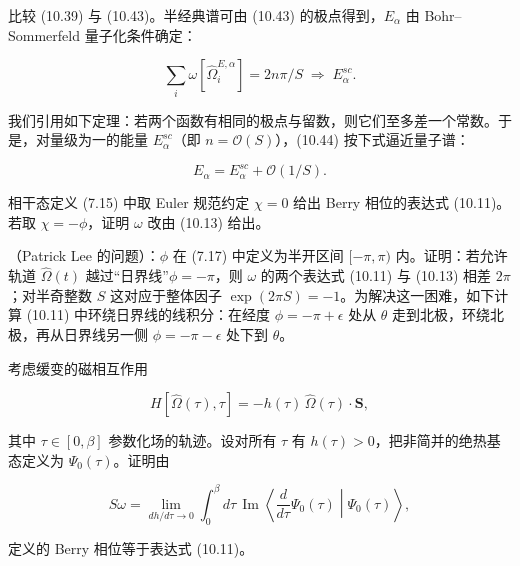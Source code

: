 比较 (10.39) 与 (10.43)。半经典谱可由 (10.43) 的极点得到，$E_{\alpha}$ 由 Bohr--Sommerfeld 量子化条件确定：

\begin{equation*}
\sum_ {i} \omega [ \hat {\Omega} _ {i} ^ {E, \alpha} ] = 2 n \pi / S \; \Rightarrow \; E _ {\alpha} ^ {sc}.
\tag{10.44}
\end{equation*}

我们引用如下定理：若两个函数有相同的极点与留数，则它们至多差一个常数。于是，对量级为一的能量 $E_{\alpha}^{sc}$（即 $n = \mathcal{O}(S)$），(10.44) 按下式逼近量子谱：

\begin{equation*}
E _ {\alpha} = E _ {\alpha} ^ {sc} + \mathcal {O} ( 1/S ).
\tag{10.45}
\end{equation*}

\begin{exercises}

\item 相干态定义 (7.15) 中取 Euler 规范约定 $\chi = 0$ 给出 Berry 相位的表达式 (10.11)。若取 $\chi = -\phi$，证明 $\omega$ 改由 (10.13) 给出。

\item（Patrick Lee 的问题）：$\phi$ 在 (7.17) 中定义为半开区间 $[- \pi, \pi)$ 内。证明：若允许轨道 $\hat{\Omega}(t)$ 越过“日界线”$\phi = -\pi$，则 $\omega$ 的两个表达式 (10.11) 与 (10.13) 相差 $2\pi$；对半奇整数 $S$ 这对应于整体因子 $\exp(2\pi S) = -1$。为解决这一困难，如下计算 (10.11) 中环绕日界线的线积分：在经度 $\phi = -\pi + \epsilon$ 处从 $\theta$ 走到北极，环绕北极，再从日界线另一侧 $\phi = -\pi - \epsilon$ 处下到 $\theta$。

\item 考虑缓变的磁相互作用

\begin{equation*}
H [ \hat {\Omega} ( \tau ), \tau ] = - h ( \tau ) \, \hat {\Omega} ( \tau ) \cdot \mathbf {S} ,
\tag{10.46}
\end{equation*}

其中 $\tau \in [0, \beta]$ 参数化场的轨迹。设对所有 $\tau$ 有 $h(\tau) > 0$，把非简并的绝热基态定义为 $\Psi_0(\tau)$。证明由

\begin{equation*}
S \omega = \lim _ {dh / d\tau \rightarrow 0} \int_ {0} ^ {\beta} d \tau \, \operatorname{Im} \left\langle \frac {d}{d \tau} \Psi_ {0} ( \tau ) \middle| \Psi_ {0} ( \tau ) \right\rangle ,
\tag{10.47}
\end{equation*}

定义的 Berry 相位等于表达式 (10.11)。

\end{exercises}

